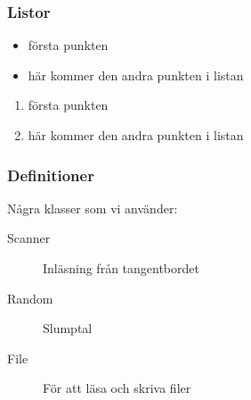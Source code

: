 \begin{frame}[fragile,t]
  \frametitle{Listor}
  \vspace{1em}
  

  \begin{exlatex}
\begin{itemize}
  \item första punkten
  \item här kommer den andra
  punkten i listan
\end{itemize}
  \end{exlatex}

  \blankline

  \begin{exlatex}
\begin{enumerate}
  \item första punkten
  \item här kommer den andra
  punkten i listan
\end{enumerate}
  \end{exlatex}

\end{frame}

\begin{frame}[fragile,t]
  \frametitle{Definitioner}
  \vspace{2em}


  \begin{exlatex}
Några klasser som vi använder:

\begin{description}
  \item[Scanner] Inläsning från tangentbordet
  \item[Random] Slumptal
  \item[File] För att läsa och skriva filer
\end{description}
  \end{exlatex}

\end{frame}


